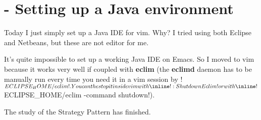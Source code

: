 \section{ - Setting up a Java environment}

Today I just simply set up a Java IDE for vim. Why? I tried using both
Eclipse and Netbeans, but these are not editor for me.

It's quite impossible to set up a working Java IDE on Emacs. So I
moved to vim because it works very well if coupled with \textbf{eclim}
(the \textbf{eclimd} daemon has to be manually run every time you need
it in a vim session by
\inline!$ECLIPSE_HOME/eclim!. You can the stop it inside vim with
\inline!:ShutdownEclim! or with
\inline!$ECLIPSE_HOME/eclim -command shutdown!).

The study of the Strategy Pattern has finished.